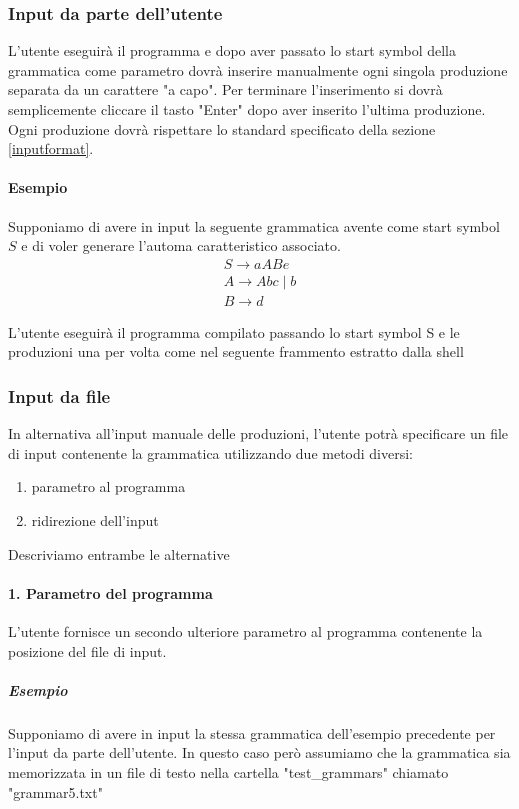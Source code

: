 \documentclass[12pt]{article}
\begin{document}
\subsubsection{Input da parte dell'utente}
L'utente eseguirà il programma e dopo aver passato lo start symbol della grammatica come parametro dovrà inserire manualmente ogni singola produzione separata da un carattere "a capo". Per terminare l'inserimento si dovrà semplicemente cliccare il tasto "Enter" dopo aver inserito l'ultima produzione. Ogni produzione dovrà rispettare lo standard specificato della sezione \ref{inputformat}.\\

\paragraph{Esempio}
Supponiamo di avere in input la seguente grammatica avente come start symbol $S$ e di voler generare l'automa caratteristico associato.
\begin{align*}
    S \to aABe \\
	A \to Abc \mid b \\
	B \to d 
\end{align*}

L'utente eseguirà il programma compilato passando lo start symbol S e le produzioni una per volta come nel seguente frammento estratto dalla shell



\subsubsection{Input da file}
In alternativa all'input manuale delle produzioni, l'utente potrà specificare un file di input contenente la grammatica utilizzando due metodi diversi:
\begin{enumerate}
\item parametro al programma
\item ridirezione dell'input
\end{enumerate}

Descriviamo entrambe le alternative
\paragraph{1. Parametro del programma} L'utente fornisce un secondo ulteriore parametro al programma contenente la posizione del file di input. 

\subparagraph{Esempio}
Supponiamo di avere in input la stessa grammatica dell'esempio precedente per l'input da parte dell'utente. In questo caso però assumiamo che la grammatica sia memorizzata in un file di testo nella cartella "test\_grammars" chiamato "grammar5.txt"\\
\end{document}
